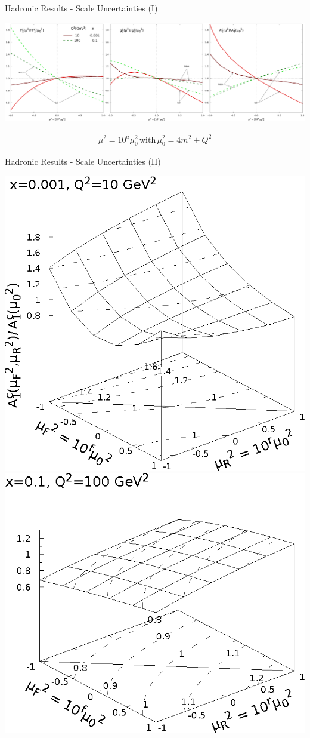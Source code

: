 \begin{frame}{Hadronic Results - Scale Uncertainties (I)}
\begin{center}
\includegraphics[width=\textwidth]{img/F1g1A-mu2}
\end{center}
\begin{align}
\mu^2 = 10^a\mu_0^2\,\text{with}\,\mu_0^2=4m^2+Q^2
\end{align}
\end{frame}

\begin{frame}{Hadronic Results - Scale Uncertainties (II)}
\begin{center}
\includegraphics[width=.48\textwidth]{img/A1-muF2-muR2-x_3-q2_1}
\includegraphics[width=.48\textwidth]{img/A1-muF2-muR2-x_1-q2_2}
\end{center}
\end{frame}
